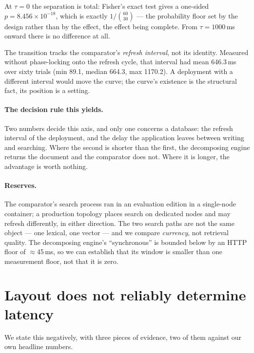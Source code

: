 \documentclass[11pt,a4paper]{article}
\begin{document}
At $\tau = 0$ the separation is total: Fisher's exact test gives a one-sided
$p = 8.456\times10^{-18}$, which is exactly $1/\binom{60}{30}$ --- the probability floor set by the
design rather than by the effect, the effect being complete. From $\tau = 1000$\,ms onward there is
no difference at all.

The transition tracks the comparator's \emph{refresh interval}, not its identity. Measured without
phase-locking onto the refresh cycle, that interval had mean 646.3\,ms over sixty trials
(min 89.1, median 664.3, max 1170.2). A deployment with a different interval would move the curve;
the curve's existence is the structural fact, its position is a setting.

\paragraph{The decision rule this yields.} Two numbers decide this axis, and only one concerns a
database: the refresh interval of the deployment, and the delay the application leaves between
writing and searching. Where the second is shorter than the first, the decomposing engine returns
the document and the comparator does not. Where it is longer, the advantage is worth nothing.

\paragraph{Reserves.} The comparator's search process ran in an evaluation edition in a single-node
container; a production topology places search on dedicated nodes and may refresh differently, in
either direction. The two search paths are not the same object --- one lexical, one vector --- and
we compare \emph{currency}, not retrieval quality. The decomposing engine's ``synchronous'' is
bounded below by an HTTP floor of $\approx$45\,ms, so we can establish that its window is smaller
than one measurement floor, not that it is zero.

\section{Layout does not reliably determine latency}
\label{sec:inference}

We state this negatively, with three pieces of evidence, two of them against our own headline
numbers.
\end{document}
